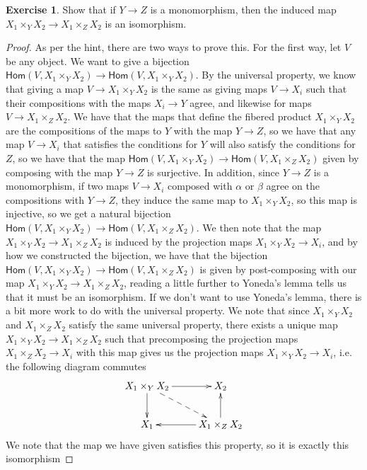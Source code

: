 \documentclass[psamsfonts]{amsart}
\theoremstyle{definition}
\newtheorem{exer}[thm]{Exercise}
\theoremstyle{remark}
\renewcommand{\hom}{\mathsf{Hom}}
\begin{document}
%
\begin{exer}
Show that if $Y \to Z$ is a monomorphism, then the induced map $X_1 \times_Y X_2 \to X_1 \times_Z X_2$ is an isomorphism. 
\end{exer}
%
\begin{proof}
As per the hint, there are two ways to prove this. For the first way, let $V$ be any object. We want to give a bijection $\hom(V,X_1 \times_Y X_2) \to \hom(V, X_1 \times_Y X_2)$. By the universal property, we know that giving a map $V \to X_1 \times_Y X_2$ is the same as giving maps $V \to X_i$ such that their compositions with the maps $X_i \to Y$ agree, and likewise for maps $V \to X_1 \times_Z X_2$. We have that the maps that define the fibered product  $X_1 \times_Y X_2$ are the compositions of the maps to $Y$ with the map $Y \to Z$, so we have that any map $V \to X_i$ that satisfies the conditions for $Y$ will also satisfy the conditions for $Z$,  so we have that the map $\hom(V, X_1 \times_Y X_2) \to \hom(V, X_1 \times_Z X_2)$ given by composing with the map $Y \to Z$ is surjective. In addition, since $Y \to Z$ is a monomorphism, if two maps $V \to X_i$ composed with  $\alpha$ or $\beta$ agree on the compositions with $Y \to Z$, they induce the same map to $X_1 \times_Y X_2$, so this map is injective, so we get a natural bijection $\hom(V, X_1 \times_Y X_2) \to \hom(V, X_1 \times_Z X_2)$. We then note that the map $X_1 \times_Y X_2 \to X_1 \times_Z X_2$ is induced by the projection maps $X_1 \times_Y X_2 \to X_i$, and by how we constructed the bijection, we have that the bijection $\hom(V, X_1 \times_Y X_2) \to \hom(V,X_1 \times_Z X_2)$ is given by post-composing with our map $X_1 \times_Y X_2 \to X_1 \times_Z X_2$, reading a little further to Yoneda's lemma tells us that it must be an isomorphism. If we don't want to use Yoneda's lemma, there is a bit more work to do with the universal property. We note that since $X_1 \times_Y X_2$ and $X_1 \times_Z X_2$ satisfy the same universal property, there exists a unique map $X_1 \times_Y X_2 \to X_1 \times_Z X_2$ such that precomposing the projection maps $X_1 \times_Z X_2 \to X_i$ with this map gives us the projection maps $X_1\times_Y X_2 \to X_i$, i.e. the following diagram commutes
$$\xymatrix{
X_1 \times_Y X_2  \ar@{-->}[dr] \ar[d] \ar[r] & X_2 \\
X_1 & X_1\times_Z X_2 \ar[u] \ar[l]
}$$
We note that the map we have given satisfies this property, so it is exactly this isomorphism
\iffalse
Alternatively, we can use the magic diagram, which tells us that the following diagram commutes
$$\xymatrix{
X_1 \times_Y X_2  \ar[d]_\gamma \ar[r]^{\varphi}  & X_1 \times_Z X_2 \ar[d]^\delta \\
Y \ar[r]_\psi & Y \times_Z Y
}$$
From a previous exercise, since $Y \to Z$ is a monomorphism, the bottom map is an isomorphism. We claim that this implies that the top map is an isomorphism. To show this, we use a similar strategy of showing that $X_1 \times_Z X_2$ satisfies the same universal property as $X_1 \times_Y X_2$. Since $\psi$ is an isomorphism,
\fi

\end{proof}
\end{document}
